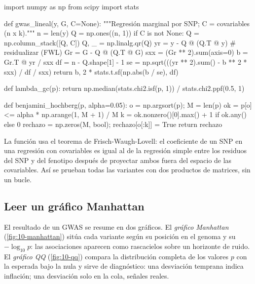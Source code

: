 \begin{codigo}[asociacion.py]
import numpy as np
from scipy import stats

def gwas_lineal(y, G, C=None):
    """Regresión marginal por SNP; C = covariables (n x k)."""
    n = len(y)
    Q = np.ones((n, 1))
    if C is not None:
        Q = np.column_stack([Q, C])
    Q, _ = np.linalg.qr(Q)
    yr = y - Q @ (Q.T @ y)                       # residualizar (FWL)
    Gr = G - Q @ (Q.T @ G)
    sxx = (Gr ** 2).sum(axis=0)
    b = Gr.T @ yr / sxx
    df = n - Q.shape[1] - 1
    se = np.sqrt(((yr ** 2).sum() - b ** 2 * sxx) / df / sxx)
    return b, 2 * stats.t.sf(np.abs(b / se), df)

def lambda_gc(p):
    return np.median(stats.chi2.isf(p, 1)) / stats.chi2.ppf(0.5, 1)

def benjamini_hochberg(p, alpha=0.05):
    o = np.argsort(p); M = len(p)
    ok = p[o] <= alpha * np.arange(1, M + 1) / M
    k = ok.nonzero()[0].max() + 1 if ok.any() else 0
    rechazo = np.zeros(M, bool); rechazo[o[:k]] = True
    return rechazo
\end{codigo}

La función  usa el teorema de Frisch-Waugh-Lovell: el coeficiente de un SNP en una regresión con covariables es igual al de la regresión simple entre los residuos del SNP y del fenotipo después de proyectar ambos fuera del espacio de las covariables. Así se prueban todas las variantes con dos productos de matrices, sin un bucle.

\subsection{Leer un gráfico Manhattan}

El resultado de un GWAS se resume en dos gráficos. El \emph{gráfico Manhattan} (\cref{fig:10-manhattan}) sitúa cada variante según su posición en el genoma y su $-\log_{10}p$: las asociaciones aparecen como rascacielos sobre un horizonte de ruido. El \emph{gráfico QQ} (\cref{fig:10-qq}) compara la distribución completa de los valores $p$ con la esperada bajo la nula y sirve de diagnóstico: una desviación temprana indica inflación; una desviación solo en la cola, señales reales.


